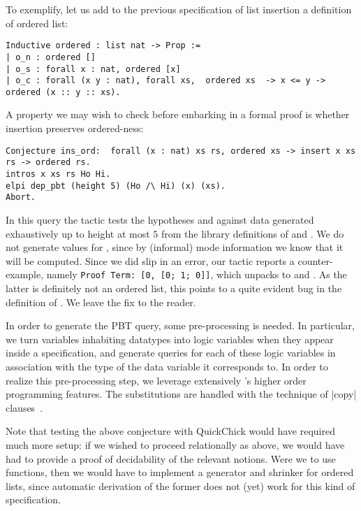 To exemplify, let us add to the previous specification of list
insertion a definition of ordered list:
\begin{lstlisting}
Inductive ordered : list nat -> Prop :=
| o_n : ordered []
| o_s : forall x : nat, ordered [x]
| o_c : forall (x y : nat), forall xs,  ordered xs  -> x <= y -> ordered (x :: y :: xs).     
\end{lstlisting}
%
A property we may wish to check before embarking in a formal proof is
whether insertion preserves ordered-ness:
\begin{lstlisting}
Conjecture ins_ord:  forall (x : nat) xs rs, ordered xs -> insert x xs rs -> ordered rs.
intros x xs rs Ho Hi.
elpi dep_pbt (height 5) (Ho /\ Hi) (x) (xs).
Abort.
\end{lstlisting}
In this query the tactic tests the hypotheses  and 
against data  generated exhaustively up to height
at most $5$  from the library  definitions of
 and . We do not generate values for ,
since by (informal) mode information we know that it will be computed.
%
Since we did slip in an error, our tactic reports a counter-example,
namely \verb|Proof Term: [0, [0; 1; 0]]|, which unpacks to 
and . As the latter is definitely not an
ordered list, this points to a quite evident bug in the definition of
. We leave the fix to the reader. %


In order to generate the PBT query, some
pre-processing is needed. In particular, we turn 
variables inhabiting datatypes into \lP logic variables when they appear inside a
specification, and  generate queries %
for each of
these logic variables in association with the type of the data
variable it corresponds to.  In order to realize this pre-processing step,
we leverage extensively \lP's higher order programming features. The
substitutions are handled with the technique of \lsti|copy| clauses~\cite{miller91jlc}.

Note that testing the above conjecture with \textsf{QuickChick} would
have required much more setup: if we wished to proceed relationally as
above, we would have had to provide a proof of decidability of the
relevant notions. Were we to use functions, then we would have to
implement a generator and shrinker for ordered lists, since automatic
derivation of the former does not (yet) work for this kind of specification.


